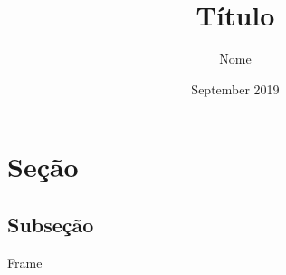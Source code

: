 \documentclass{beamer}
\title{Título}
\author{Nome}
\date{September 2019}
\begin{document}
\maketitle

\section{Seção}

\subsection{Subseção}

\begin{frame}{Frame}
\lipsum[1]
\end{frame}
\end{document}
